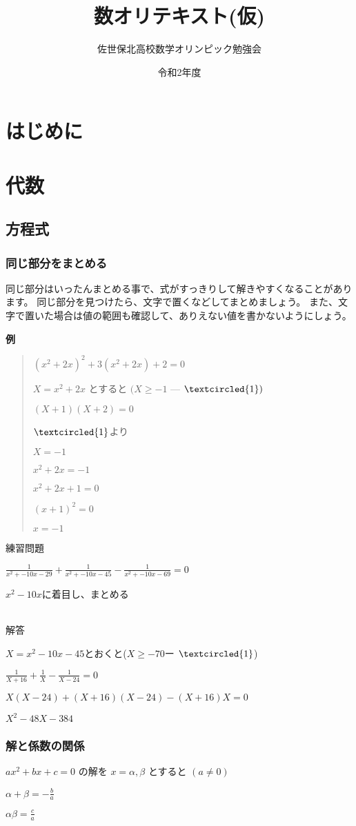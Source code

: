 \documentclass[uplatex]{jsbook}
\begin{document}
\title{数オリテキスト(仮)}
\author{佐世保北高校数学オリンピック勉強会}
\date{令和2年度}
\maketitle

\part{はじめに}

\part{代数}
\chapter{方程式}
\section{同じ部分をまとめる}
同じ部分はいったんまとめる事で、式がすっきりして解きやすくなることがあります。
同じ部分を見つけたら、文字で置くなどしてまとめましょう。
また、文字で置いた場合は値の範囲も確認して、ありえない値を書かないようにしょう。

\vspace{15pt} {\large \textbf{例}}

\begin{quote}
    $(x^2+2x)^2+3(x^2+2x)+2=0$

    $X=x^2+2x$
    とすると
    $(X\geq-1$ –– $ \textcircled{\scriptsize1})$
    
    $(X+1)(X+2)=0$
    
    $ \textcircled{\scriptsize1} $より
    
    $X=-1$
    
    $x^2+2x=-1$
    
    $x^2+2x+1=0$
    
    $(x+1)^2=0$
    
    $x=-1$
\end{quote}

練習問題

$\frac{1}{x^2+-10x-29}+\frac{1}{x^2+-10x-45}-\frac{1}{x^2+-10x-69}=0$


$x^2-10x$に着目し、まとめる

\paragraph{}解答

$X=x^2-10x-45$とおくと($X\geq-70$ー $\textcircled{\scriptsize1}$)

$\frac{1}{X+16}+\frac{1}{X}-\frac{1}{X-24}=0$

$X(X-24)+(X+16)(X-24)-(X+16)X=0$

$X^2-48X-384$

\section{解と係数の関係}

$ax^2+bx+c=0$
の解を
$x=\alpha,\beta$
とすると
$(a\neq0)$

$\alpha+\beta=-\frac{b}{a}$

$\alpha\beta=\frac{c}{a}$
\end{document}
